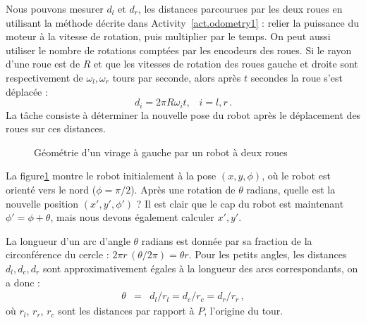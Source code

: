 {Nous pouvons mesurer $d_l$ et $d_r$, les distances parcourues par les deux roues en utilisant la méthode décrite dans Activity~\ref{act.odometry1} : relier la puissance du moteur à la vitesse de rotation, puis multiplier par le temps. On peut aussi utiliser le nombre de rotations comptées par les encodeurs des roues. Si le rayon d'une roue est de $R$ et que les vitesses de rotation des roues gauche et droite sont respectivement de $\omega_l,\omega_r$ tours par seconde, alors après $t$ secondes la roue s'est déplacée :
\begin{equation}
d_i=2\pi R \omega_i t,\;\;\;i=l,r\,. \label{eq.rotation}
\end{equation}
La tâche consiste à déterminer la nouvelle pose du robot après le déplacement des roues sur ces distances.

\begin{figure}
\begin{center}
\end{center}
\caption{Géométrie d'un virage à gauche par un robot à deux roues}\label{fig.small-turn}
\end{figure}

La figure\ref{fig.small-turn} montre le robot initialement à la pose $(x,y,\phi)$, où le robot est orienté vers le nord ($\phi=\pi/2$). Après une rotation de $\theta$ radians, quelle est la nouvelle position $(x',y',\phi')$ ? Il est clair que le cap du robot est maintenant $\phi'=\phi+\theta$, mais nous devons également calculer $x',y'$.

La longueur d'un arc d'angle $\theta$ radians est donnée par sa fraction de la circonférence du cercle : $2\pi r\,(\theta/2\pi)=\theta r$. Pour les petits angles, les distances $d_l,d_c,d_r$ sont approximativement égales à la longueur des arcs correspondants, on a donc :
\begin{eqnarray}
\theta &=& d_l/r_l = d_c/r_c = d_r/r_r\,,\label{eqn.theta}
\end{eqnarray}
où $r_l$, $r_r$, $r_c$ sont les distances par rapport à $P$, l'origine du tour.

}
